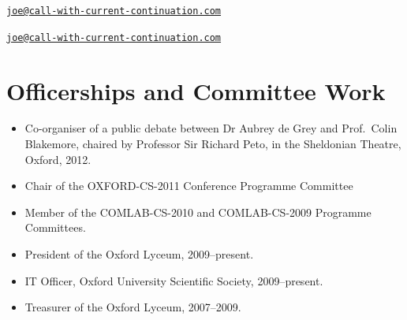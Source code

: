 \documentclass[12pt,twoside,letterpaper]{article}
\begin{document}


\vspace{-8mm}


\vspace{-5mm}


\vspace{-8mm}


\vspace{-5mm}


\newpage


\vspace*{-23mm}\hfill\href{mailto:joe@call-with-current-continuation.com}%
{\nolinkurl{joe@call-with-current-continuation.com}}

\vspace{-12mm}


\vspace{-6.5mm}


\vspace{-6.5mm}


\vspace{-6.5mm}


\setlength{\fboxsep}{0pt}

\vspace{-6.5mm}


\vspace{-4.5mm}


\noindent


\newpage


\vspace*{-23mm}\hfill\href{mailto:joe@call-with-current-continuation.com}%
{\nolinkurl{joe@call-with-current-continuation.com}}

\vspace{-3mm}
\section*{Officerships and Committee Work}
\vspace{-2mm}

\begin{itemize}
	\item Co-organiser of a public debate between Dr Aubrey de Grey
		and Prof.\ Colin Blakemore, chaired by Professor Sir Richard
		Peto, in the Sheldonian Theatre, Oxford, 2012.
	\item Chair of the OXFORD-CS-2011 Conference Programme Committee
	\item Member of the COMLAB-CS-2010 and COMLAB-CS-2009 Programme
		Committees.
	\item President of the Oxford Lyceum, 2009--present.
	\item IT Officer, Oxford University Scientific Society, 2009--present.
	\item Treasurer of the Oxford Lyceum, 2007--2009.
\end{itemize}
\end{document}
